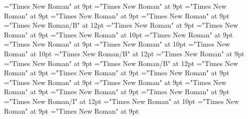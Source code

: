 \documentclass[gps1,twoside]{article}
\begin{document}
\font\spanowningentrysummarydefinitioncomplexformsnotsubentrycomplexformsnotsubentriesentryfirstchildbefore="Times New Roman" at 9pt
\font\spanowningentrysummarydefinitioncomplexformsnotsubentrycomplexformsnotsubentriesentrylastchildafter="Times New Roman" at 9pt
\font\nontrivialentryrootnontrivialentryrootnontrivialentryrootscomplexformsnotsubentrycomplexformsnotsubentriesentrybefore="Times New Roman" at 9pt
\font\nontrivialentryrootscomplexformsnotsubentrycomplexformsnotsubentriesentrybefore="Times New Roman" at 9pt
\font\nontrivialentryrootscomplexformsnotsubentrycomplexformsnotsubentriesentryafter="Times New Roman" at 9pt
\font\nontrivialentryrootnontrivialentryrootscomplexformsnotsubentrycomplexformsnotsubentriesentry="Times New Roman/B" at 12pt
\font\spanspanpicturesentrybefore="Times New Roman" at 9pt
\font\picturesentryafter="Times New Roman" at 9pt
\font\picturepicturesentry="Times New Roman" at 10pt
\font\picturepicturesentryafter="Times New Roman" at 9pt
\font\spanspancaptionpicturepicturesentrybefore="Times New Roman" at 9pt
\font\paracontinuationsubentriesentry="Times New Roman" at 10pt
\font\subentrysubentriesentry="Times New Roman" at 10pt
\font\spanbzhheadwordsubentrysubentriesentry="Times New Roman/B" at 12pt
\font\spanspanheadwordsubentrysubentriesentrybefore="Times New Roman" at 9pt
\font\spanheadwordsubentrysubentriesentrylastchildafter="Times New Roman" at 9pt
\font\spanheadwordsubentrysubentriesentry="Times New Roman/B" at 12pt
\font\complexformtypessubentrysubentriesentryafter="Times New Roman" at 9pt
\font\spanspanreverseabbrcomplexformtypecomplexformtypessubentrysubentriesentrybefore="Times New Roman" at 9pt
\font\pronunciationpronunciationpronunciationssubentrysubentriesentrybefore="Times New Roman" at 9pt
\font\pronunciationssubentrysubentriesentryafter="Times New Roman" at 9pt
\font\spanspanformpronunciationpronunciationssubentrysubentriesentrybefore="Times New Roman" at 9pt
\font\spanformpronunciationpronunciationssubentrysubentriesentryfirstchildbefore="Times New Roman" at 9pt
\font\spanformpronunciationpronunciationssubentrysubentriesentrylastchildafter="Times New Roman" at 9pt
\font\locationpronunciationpronunciationssubentrysubentriesentryafter="Times New Roman" at 9pt
\font\locationpronunciationpronunciationssubentrysubentriesentry="Times New Roman/I" at 12pt
\font\spanwritingsystemprefixspanabbreviationlocationpronunciationpronunciationssubentrysubentriesentry="Times New Roman" at 10pt
\font\spanwritingsystemprefixspanabbreviationlocationpronunciationpronunciationssubentrysubentriesentryafter="Times New Roman" at 9pt
\font\spanspanabbreviationlocationpronunciationpronunciationssubentrysubentriesentrybefore="Times New Roman" at 9pt
\end{document}
